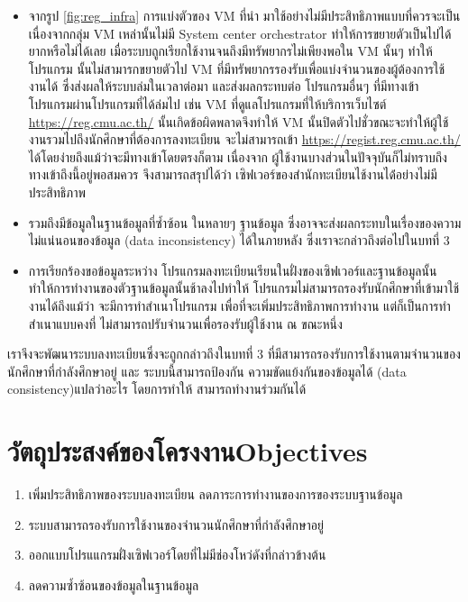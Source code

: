 \begin{itemize}
\item จากรูป \ref{fig:reg_infra} การแบ่งตัวของ VM \cite{vm} ที่นำ มาใช้อย่างไม่มีประสิทธิภาพแบบที่ควรจะเป็น
เนื่องจากกลุ่ม VM เหล่านั้นไม่มี System center orchestrator \cite{sco} ทำให้การขยายตัวเป็นไปได้ยากหรือไม่ได้เลย เมื่อระบบถูกเรียกใช้งานจนถึงมีทรัพยากรไม่เพียงพอใน VM นั้นๆ ทำให้โปรแกรม นั้นไม่สามารกขยายตัวไป VM ที่มีทรัพยากรรองรับเพื่อแบ่งจำนวนของผู้ต้องการใช้งานได้ ซึ่งส่งผลให้ระบบล่มในเวลาต่อมา และส่งผลกระทบต่อ โปรแกรมอื่นๆ 
ที่มีทางเข้าโปรแกรมผ่านโปรแกรมที่ได้ล่มไป เช่น VM ที่ดูแลโปรแกรมที่ให้บริการเว็บไซต์ \url{https://reg.cmu.ac.th/} นั้นเกิดข้อผิดพลาดจึงทำให้ VM นั้นปิดตัวไปชั่วขณะจะทำให้ผู้ใช้งานรวมไปถึงนักศึกษาที่ต้องการลงทะเบียน จะไม่สามารถเข้า \url{https://regist.reg.cmu.ac.th/} ได้โดยง่ายถึงแม้ว่าจะมีทางเข้าโดยตรงก็ตาม เนื่องจาก ผู้ใช้งานบางส่วนในปัจจุบันก็ไม่ทราบถึงทางเข้าถึงนี้อยู่พอสมควร จึงสามารถสรุปได้ว่า เซิฟเวอร์ของสำนักทะเบียนไช้งานได้่อย่างไม่มีประสิทธิภาพ

\item รวมถึงมีข้อมูลในฐานข้อมูลที่ซ้ำซ้อน ในหลายๆ ฐานข้อมูล ซึ่งอาจจะส่งผลกระทบในเรื่องของความไม่แน่นอนของข้อมูล (data inconsistency) ได้ในภายหลัง ซึ่งเราจะกล่าวถึงต่อไปในบทที่ 3

\item การเรียกร้องขอข้อมูลระหว่าง โปรแกรมลงทะเบียนเรียนในฝั่งของเซิฟเวอร์และฐานข้อมูลนั้น ทำให้การทำงานของตัวฐานข้อมูลนั้นช้าลงไปทำให้ โปรแกรมไม่สามารถรองรับนักศึกษาที่เข้ามาใช้งานได้ถึงแม้ว่า จะมีการทำสำเนาโปรแกรม เพื่อที่จะเพิ่มประสิทธิภาพการทำงาน แต่ก็เป็นการทำสำเนาแบบคงที่ ไม่สามารถปรับจำนวนเพื่อรองรับผู้ใช้งาน ณ ขณะหนึ่ง
\end{itemize}

เราจึงจะพัฒนาระบบลงทะเบียนซึ่งจะถูกกล่าวถึงในบทที่ 3 ที่มีสามารถรองรับการใช้งานตามจำนวนของนักศึกษาที่กำลังศึกษาอยู่ และ ระบบนี้สามารถป้องกัน ความขัดแย้งกันของข้อมูลได้ (data consistency){แปลว่าอะไร} โดยการทำให้ สามารถทำงานร่วมกันได้

\section{\ifcpe วัตถุประสงค์ของโครงงาน\else Objectives\fi}
\begin{enumerate}
    \item เพิ่มประสิทธิภาพของระบบลงทะเบียน ลดภาระการทำงานของการของระบบฐานข้อมูล
    \item ระบบสามารถรองรับการใช้งานของจำนวนนักศึกษาที่กำลังศึกษาอยู่
    \item ออกแบบโปรแแกรมฝั่งเซิฟเวอร์โดยที่ไม่มีช่องโหว่ดังที่กล่าวข้างต้น
    \item ลดความซ้ำซ้อนของข้อมูลในฐานข้อมูล
\end{enumerate}

